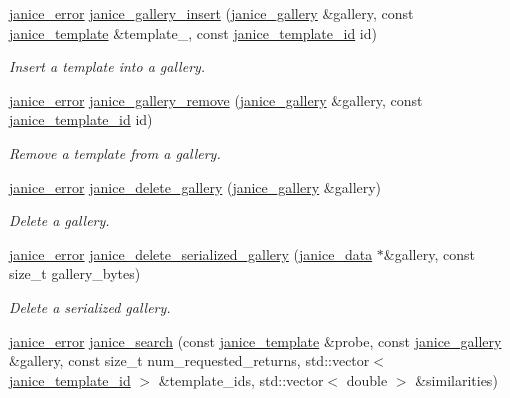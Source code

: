 \begin{DoxyCompactItemize}
\hyperlink{group__janice_ga4873d49c1f9d6a6880dfbd485cf6ba72}{janice\+\_\+error} \hyperlink{group__janice_gafdada12251f62924c69690eff1fcb01b}{janice\+\_\+gallery\+\_\+insert} (\hyperlink{group__janice_ga08feff1c2835b44332afeda80c3d0fb7}{janice\+\_\+gallery} \&gallery, const \hyperlink{group__janice_ga5593b06e86b90504968c0fc191ee2f3c}{janice\+\_\+template} \&template\+\_\+, const \hyperlink{group__janice_ga5ec62465fbbc7a92faadfefd3d20e25b}{janice\+\_\+template\+\_\+id} id)
\begin{DoxyCompactList}\small\item\em Insert a template into a gallery. \end{DoxyCompactList}\item 
\hyperlink{group__janice_ga4873d49c1f9d6a6880dfbd485cf6ba72}{janice\+\_\+error} \hyperlink{group__janice_gad9e267cc142bbf9edb87b42129a9783f}{janice\+\_\+gallery\+\_\+remove} (\hyperlink{group__janice_ga08feff1c2835b44332afeda80c3d0fb7}{janice\+\_\+gallery} \&gallery, const \hyperlink{group__janice_ga5ec62465fbbc7a92faadfefd3d20e25b}{janice\+\_\+template\+\_\+id} id)
\begin{DoxyCompactList}\small\item\em Remove a template from a gallery. \end{DoxyCompactList}\item 
\hyperlink{group__janice_ga4873d49c1f9d6a6880dfbd485cf6ba72}{janice\+\_\+error} \hyperlink{group__janice_ga958fde5559c558b2187e0c0507f882db}{janice\+\_\+delete\+\_\+gallery} (\hyperlink{group__janice_ga08feff1c2835b44332afeda80c3d0fb7}{janice\+\_\+gallery} \&gallery)
\begin{DoxyCompactList}\small\item\em Delete a gallery. \end{DoxyCompactList}\item 
\hyperlink{group__janice_ga4873d49c1f9d6a6880dfbd485cf6ba72}{janice\+\_\+error} \hyperlink{group__janice_ga0b100036078a42661fc4dd97097fea66}{janice\+\_\+delete\+\_\+serialized\+\_\+gallery} (\hyperlink{group__janice_ga63103e7e1c9df7d7403640223f3f6f07}{janice\+\_\+data} $\ast$\&gallery, const size\+\_\+t gallery\+\_\+bytes)
\begin{DoxyCompactList}\small\item\em Delete a serialized gallery. \end{DoxyCompactList}\item 
\hyperlink{group__janice_ga4873d49c1f9d6a6880dfbd485cf6ba72}{janice\+\_\+error} \hyperlink{group__janice_gacf0576e4ddcad691ff955fc3eee1e2eb}{janice\+\_\+search} (const \hyperlink{group__janice_ga5593b06e86b90504968c0fc191ee2f3c}{janice\+\_\+template} \&probe, const \hyperlink{group__janice_ga08feff1c2835b44332afeda80c3d0fb7}{janice\+\_\+gallery} \&gallery, const size\+\_\+t num\+\_\+requested\+\_\+returns, std\+::vector$<$ \hyperlink{group__janice_ga5ec62465fbbc7a92faadfefd3d20e25b}{janice\+\_\+template\+\_\+id} $>$ \&template\+\_\+ids, std\+::vector$<$ double $>$ \&similarities)

\end{DoxyCompactItemize}
